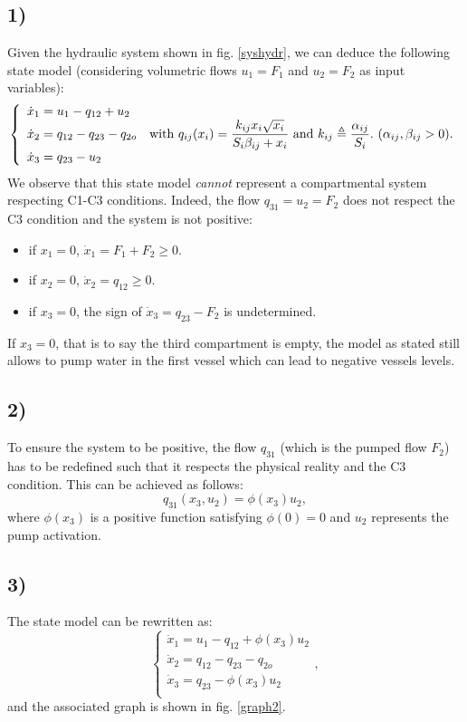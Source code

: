 \subsection*{1)}
Given the hydraulic system shown in fig. \ref{syshydr}, we can deduce the following state model (considering volumetric flows $u_1=F_1$ and $u_2=F_2$ as input variables):
\begin{equation}
\left\{
  \begin{array}{l r}
  \dot{x}_1=u_1-q_{12}+u_2 &\\
  \dot{x}_2=q_{12}-q_{23}-q_{2o} & \textnormal{with } q_{ij}(x_i)=\dfrac{k_{ij}x_i\sqrt{x_i}}{S_i\beta_{ij}+x_i} \textnormal{ and } k_{ij}\triangleq\dfrac{\alpha_{ij}}{S_i}.~(\alpha_{ij},\beta_{ij}>0).\\
  \dot{x}_3=q_{23}-u_2 &\\
  \end{array} \right.
\label{eq:statemod}
\end{equation}
We observe that this state model {\it cannot} represent a compartmental system respecting C1-C3 conditions.
Indeed, the flow $q_{31} = u_2=F_2$ does not respect the C3 condition and the system is not positive:
\begin{itemize}
\item if $x_1=0$, $\dot{x}_1=F_1+F_2\geq 0$.
\item if $x_2=0$, $\dot{x}_2=q_{12}\geq 0$.
\item if $x_3=0$, the sign of $\dot{x}_3=q_{23}-F_2$ is undetermined.
\end{itemize}
If $x_3 =0$, that is to say the third compartment is empty, the model as stated still allows to pump water in the first vessel which can lead to negative vessels levels.

\subsection*{2)}
To ensure the system to be positive, the flow $q_{31}$ (which is the pumped flow $F_2$) has to be redefined such that it respects the physical reality and the C3 condition. This can be achieved as follows:
\begin{equation}
q_{31}(x_3,u_2) = \phi(x_3)u_2,
\label{eq:q31}
\end{equation}
where $\phi(x_3)$ is a positive function satisfying $\phi(0) = 0$ and $u_2$ represents the pump activation.

\subsection*{3)}
The state model can be rewritten as:
\begin{equation}
\left\{
  \begin{array}{l}
  \dot{x}_1=u_1-q_{12}+\phi(x_3)u_2\\
  \dot{x}_2=q_{12}-q_{23}-q_{2o}\\
  \dot{x}_3=q_{23}-\phi(x_3)u_2\\
  \end{array} \right.,
\label{eq:statemod2}
\end{equation}
and the associated graph is shown in fig. \ref{graph2}.\\

